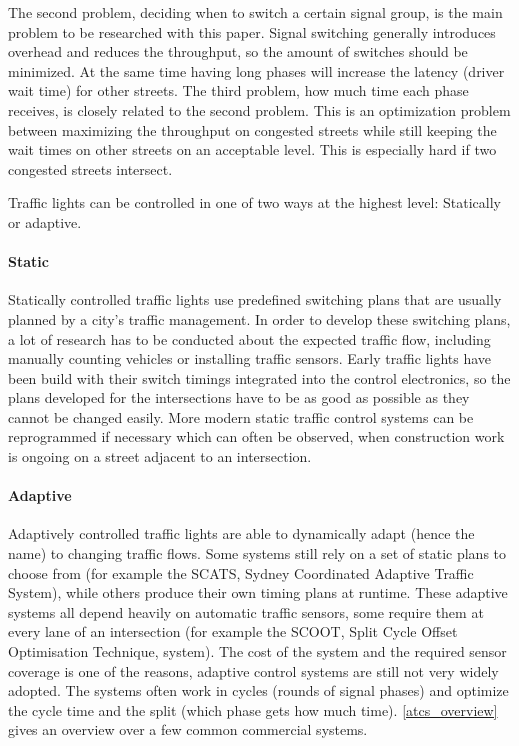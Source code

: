 The second problem, deciding when to switch a certain signal group, is the main problem to be researched with this paper. Signal switching generally introduces overhead and reduces the throughput, so the amount of switches should be minimized. At the same time having long phases will increase the latency (driver wait time) for other streets. \cite{littleslaw} The third problem, how much time each phase receives, is closely related to the second problem. This is an optimization problem between maximizing the throughput on congested streets while still keeping the wait times on other streets on an acceptable level. This is especially hard if two congested streets intersect.

Traffic lights can be controlled in one of two ways at the highest level: Statically or adaptive. \cite{rilsa}

\paragraph{Static} Statically controlled traffic lights use predefined switching plans that are usually planned by a city's traffic management. In order to develop these switching plans, a lot of research has to be conducted about the expected traffic flow, including manually counting vehicles or installing traffic sensors. Early traffic lights have been build with their switch timings integrated into the control electronics, so the plans developed for the intersections have to be as good as possible as they cannot be changed easily. More modern static traffic control systems can be reprogrammed if necessary which can often be observed, when construction work is ongoing on a street adjacent to an intersection.

\paragraph{Adaptive} Adaptively controlled traffic lights are able to dynamically adapt (hence the name) to changing traffic flows. Some systems still rely on a set of static plans to choose from (for example the SCATS, Sydney Coordinated Adaptive Traffic System), while others produce their own timing plans at runtime. These adaptive systems all depend heavily on automatic traffic sensors, some require them at every lane of an intersection (for example the SCOOT, Split Cycle Offset Optimisation Technique, system). The cost of the system and the required sensor coverage is one of the reasons, adaptive control systems are still not very widely adopted. \cite{atcs_overview} The systems often work in cycles (rounds of signal phases) and optimize the cycle time and the split (which phase gets how much time). \autoref{atcs_overview} gives an overview over a few common commercial systems.

